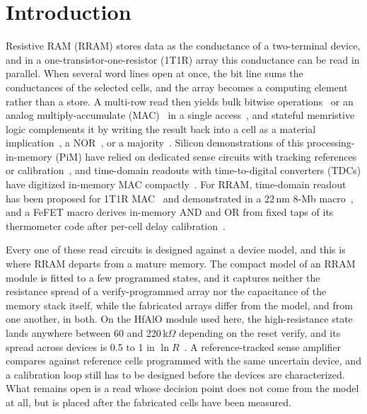 \section{Introduction}
\label{sec:intro}
Resistive RAM (RRAM) stores data as the conductance of a two-terminal device, and in a one-transistor-one-resistor (1T1R) array this conductance can be read in parallel.
When several word lines open at once, the bit line sums the conductances of the selected cells, and the array becomes a computing element rather than a store.
A multi-row read then yields bulk bitwise operations~\cite{li2016pinatubo} or an analog multiply-accumulate (MAC)~\cite{chi2016prime,shafiee2016isaac} in a single access~\cite{ielmini2018inmemory}, and stateful memristive logic complements it by writing the result back into a cell as a material implication~\cite{borghetti2010memristive}, a NOR~\cite{kvatinsky2014magic}, or a majority~\cite{gaillardon2016plim}.
Silicon demonstrations of this processing-in-memory (PiM) have relied on dedicated sense circuits with tracking references or calibration~\cite{chen2018rram65nm,wan2022neurram}, and time-domain readouts with time-to-digital converters (TDCs) have digitized in-memory MAC compactly~\cite{sayal2020timedomain,xue2024tdcim}.
For RRAM, time-domain readout has been proposed for 1T1R MAC~\cite{sahay2020vmm} and demonstrated in a 22\,nm 8-Mb macro~\cite{hung2023rram}, and a FeFET macro derives in-memory AND and OR from fixed taps of its thermometer code after per-cell delay calibration~\cite{mattar2025fefet}.

Every one of these read circuits is designed against a device model, and this is where RRAM departs from a mature memory.
The compact model of an RRAM module is fitted to a few programmed states, and it captures neither the resistance spread of a verify-programmed array nor the capacitance of the memory stack itself, while the fabricated arrays differ from the model, and from one another, in both.
On the HfAlO module used here, the high-resistance state lands anywhere between 60 and 220\,k$\Omega$ depending on the reset verify, and its spread across devices is 0.5 to 1 in $\ln R$~\cite{perez2017hfalo,baroni2025aldoping}.
A reference-tracked sense amplifier compares against reference cells programmed with the same uncertain device, and a calibration loop still has to be designed before the devices are characterized.
What remains open is a read whose decision point does not come from the model at all, but is placed after the fabricated cells have been measured.

